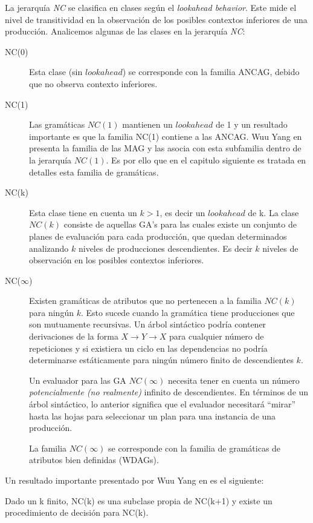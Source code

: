 La jerarquía \emph{NC} se clasifica en clases según el \textit{lookahead behavior}. Este mide el nivel de transitividad en la observación de los posibles contextos inferiores de una producción. Analicemos algunas de las clases en la jerarquía \emph{NC}:
\begin{description}
\item [NC(0)] Esta clase (sin $lookahead$) se corresponde con la familia ANCAG, debido que no observa contexto inferiores. 
\item [NC(1)] Las gramáticas $NC(1)$ mantienen un $lookahead$ de 1 y un resultado importante es que la familia NC(1) contiene a las ANCAG. Wuu Yang en \cite{wuu-yang} presenta la familia de las MAG y las asocia con esta subfamilia dentro de la jerarquía $NC(1)$. Es por ello que en el capitulo siguiente es tratada en detalles esta familia de gramáticas.
\item[NC(k)] Esta clase tiene en cuenta un $k>1$, es decir un $lookahead$ de k. La clase $NC(k)$ consiste de aquellas GA's para las cuales existe un conjunto de planes de evaluación para cada producción, que quedan determinados analizando $k$ niveles de producciones descendientes. Es decir $k$ niveles de observación en los posibles contextos inferiores.
\item[NC($\infty$)] Existen gramáticas de atributos que no pertenecen a la familia $NC(k)$ para ningún $k$. Esto sucede cuando la gramática tiene producciones que son mutuamente recursivas. Un árbol sintáctico podría contener derivaciones de la forma $X \rightarrow Y \rightarrow X$ para cualquier número de repeticiones y si existiera un ciclo en las dependencias no podría determinarse estáticamente para ningún número finito de descendientes $k$.

Un evaluador para las GA $NC(\infty)$ necesita tener en cuenta un número \emph{potencialmente (no realmente)} infinito de descendientes. En términos de un árbol sintáctico, lo anterior significa que el evaluador necesitará ``mirar'' hasta las hojas para seleccionar un plan para una instancia de una producción.

\begin{theorem} La familia $NC(\infty)$ se corresponde con la familia de gramáticas de atributos bien definidas (WDAGs).
\end{theorem}


\end{description}

Un resultado importante presentado por Wuu Yang en \cite{wuu-yang2} es el siguiente:
\begin{theorem}
 Dado un k finito, NC(k) es una subclase propia de NC(k+1) y existe un procedimiento de decisión para NC(k).
\end{theorem}



